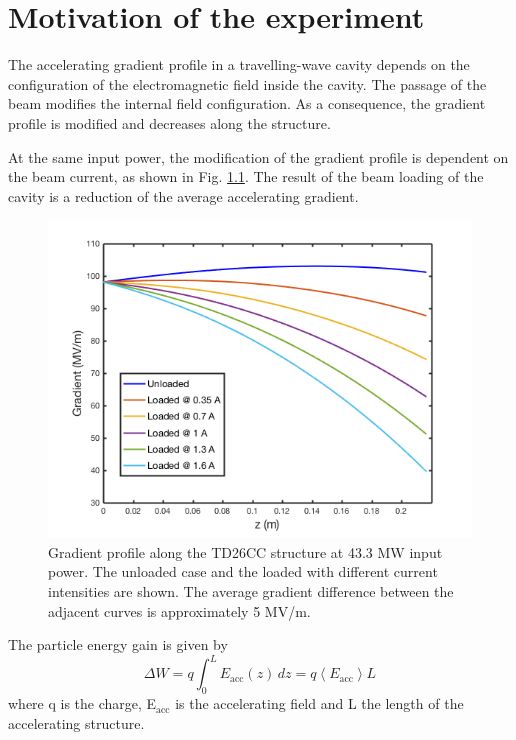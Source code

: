 \chapter[Motivation of the experiment]{Motivation of the experiment}
\label{chap:motivation}

The accelerating gradient profile in a travelling-wave cavity depends on the configuration of the electromagnetic field inside the cavity. The passage of the  beam modifies the internal field configuration. As a consequence, the gradient profile is modified and decreases along the structure.

At the same input power, the modification of the gradient profile is dependent on the beam current, as shown in Fig. \ref{grad_vs_I}. The result of the beam loading of the cavity is a reduction of the average accelerating gradient.

\begin{figure}[h]
\centering 
\includegraphics[scale=0.5]{pictures/Gradient_vs_current.png}
\caption{Gradient profile along the TD26CC structure at 43.3 MW input power. The unloaded case and the loaded with different current intensities are shown. The average gradient difference between the adjacent curves is approximately 5 MV/m.}
\label{grad_vs_I}
\end{figure}

\noindent
The particle energy gain is given by 
\begin{equation}
\Delta W  = q \int_0^L E_{\text{acc}} (z) \, dz = q \left \langle E_{\text{acc}} \right \rangle L
\label{en_gain}
\end{equation}
where q is the charge, E$_{\text{acc}}$ is the accelerating field and L the length of the accelerating structure.

